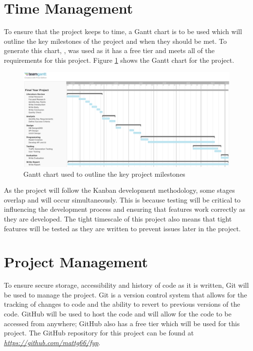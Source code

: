 \section{Time Management}
\label{methodology:time-management}
To ensure that the project keeps to time, a Gantt chart is to be used which will outline the key milestones of the project and when they should be met. To generate this chart, \citep{teamgantt}, was used as it has a free tier and meets all of the requirements for this project. Figure \ref{fig:gantt-chart} shows the Gantt chart for the project.
\begin{figure}[H]
    \centering
    \includegraphics[scale=0.2]{images/gantt-chart.png}
    \caption{Gantt chart used to outline the key project milestones}
    \label{fig:gantt-chart}
\end{figure}
As the project will follow the Kanban development methodology, some stages overlap and will occur simultaneously. This is because testing will be critical to influencing the development process and ensuring that features work correctly as they are developed. The tight timescale of this project also means that tight features will be tested as they are written to prevent issues later in the project.
\section{Project Management}
\label{methodology:project-management}
To ensure secure storage, accessibility and history of code as it is written, Git will be used to manage the project. Git is a version control system that allows for the tracking of changes to code and the ability to revert to previous versions of the code. GitHub will be used to host the code and will allow for the code to be accessed from anywhere; GitHub also has a free tier which will be used for this project. The GitHub repository for this project can be found at \textit{\url{https://github.com/mattg66/fyp}}.